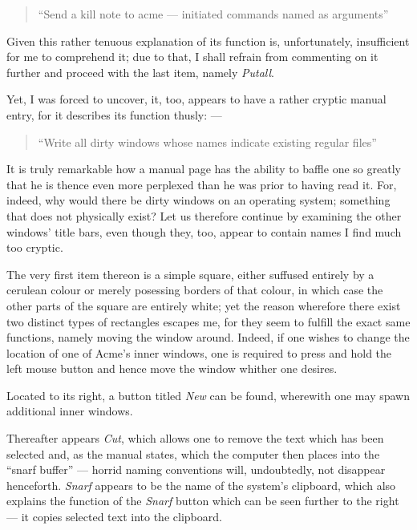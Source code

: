 \documentclass[a5paper,twoside,12pt]{report}
\begin{document}
  \begin{quote}
    ``Send a kill note to acme — initiated commands named as arguments''
  \end{quote}

  Given this rather tenuous explanation of its function is, unfortunately, insufficient for me to comprehend it; due to that, I shall refrain from commenting on it further and proceed with the last item, namely \textit{Putall}.

  Yet, I was forced to uncover, it, too, appears to have a rather cryptic manual entry, for it describes its function thusly: —

  \begin{quote}
    ``Write all dirty windows whose names indicate existing regular files''
  \end{quote}

  It is truly remarkable how a manual page has the ability to baffle one so greatly that he is thence even more perplexed than he was prior to having read it. For, indeed, why would there be dirty windows on an operating system; something that does not physically exist? Let us therefore continue by examining the other windows' title bars, even though they, too, appear to contain names I find much too cryptic.

  The very first item thereon is a simple square, either suffused entirely by a cerulean colour or merely posessing borders of that colour, in which case the other parts of the square are entirely white; yet the reason wherefore there exist two distinct types of rectangles escapes me, for they seem to fulfill the exact same functions, namely moving the window around. Indeed, if one wishes to change the location of one of Acme's inner windows, one is required to press and hold the left mouse button and hence move the window whither one desires. 

  Located to its right, a button titled \textit{New} can be found, wherewith one may spawn additional inner windows.

  Thereafter appears \textit{Cut}, which allows one to remove the text which has been selected and, as the manual states, which the computer then places into the ``snarf buffer'' — horrid naming conventions will, undoubtedly, not disappear henceforth. \textit{Snarf} appears to be the name of the system's clipboard, which also explains the function of the \textit{Snarf} button which can be seen further to the right — it copies selected text into the clipboard.
\end{document}
